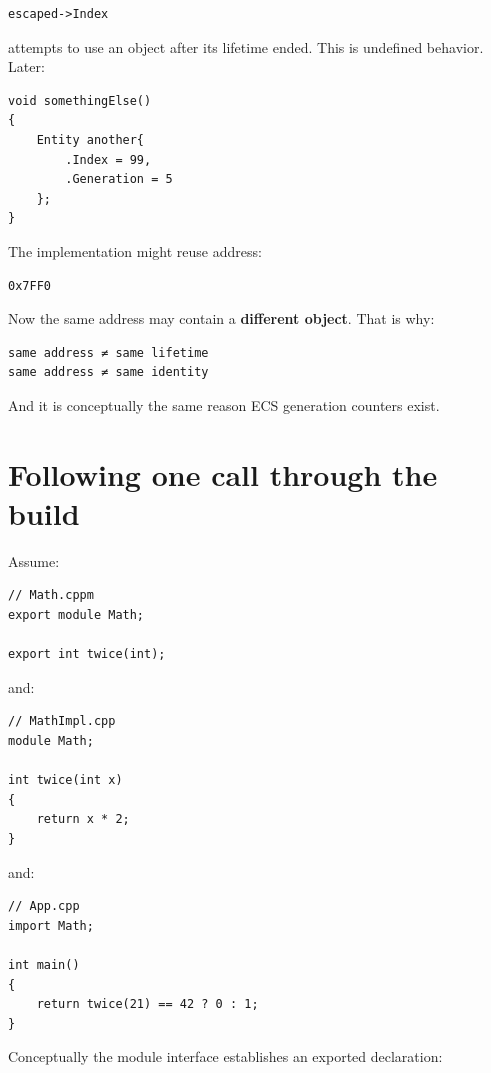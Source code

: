 \begin{verbatim}
escaped->Index
\end{verbatim}

attempts to use an object after its lifetime ended. This is undefined behavior. Later:

\begin{verbatim}
void somethingElse()
{
    Entity another{
        .Index = 99,
        .Generation = 5
    };
}
\end{verbatim}

The implementation might reuse address:

\begin{verbatim}
0x7FF0
\end{verbatim}

Now the same address may contain a \textbf{different object}. That is why:

\begin{verbatim}
same address ≠ same lifetime
same address ≠ same identity
\end{verbatim}

And it is conceptually the same reason ECS generation counters exist.

\section{Following one call through the build}\label{05-engine-i-ch003-following-one-call-through-the-build}

\hypertarget{05-engine-i-ch003-following-one-call-through-the-build}{}

Assume:

\begin{verbatim}
// Math.cppm
export module Math;

export int twice(int);
\end{verbatim}

and:

\begin{verbatim}
// MathImpl.cpp
module Math;

int twice(int x)
{
    return x * 2;
}
\end{verbatim}

and:

\begin{verbatim}
// App.cpp
import Math;

int main()
{
    return twice(21) == 42 ? 0 : 1;
}
\end{verbatim}

Conceptually the module interface establishes an exported declaration:

